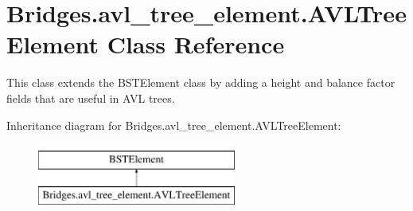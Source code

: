\hypertarget{class_bridges_1_1avl__tree__element_1_1_a_v_l_tree_element}{}\section{Bridges.\+avl\+\_\+tree\+\_\+element.\+A\+V\+L\+Tree\+Element Class Reference}
\label{class_bridges_1_1avl__tree__element_1_1_a_v_l_tree_element}


This class extends the B\+S\+T\+Element class by adding a height and balance factor fields that are useful in A\+VL trees.  


Inheritance diagram for Bridges.\+avl\+\_\+tree\+\_\+element.\+A\+V\+L\+Tree\+Element\+:\begin{figure}[H]
\begin{center}
\leavevmode
\includegraphics[height=2.000000cm]{class_bridges_1_1avl__tree__element_1_1_a_v_l_tree_element}
\end{center}
\end{figure}
